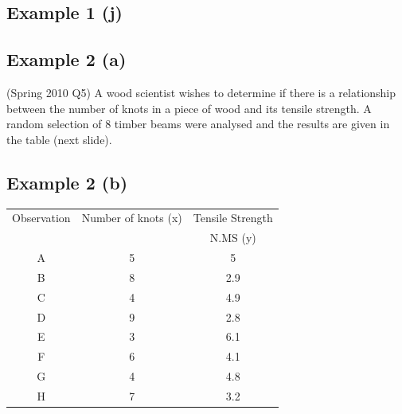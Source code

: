 \documentclass[]{report}
\begin{document}

\subsection{Example 1 (j)}

%


\subsection{Example 2 (a)}
(Spring 2010 Q5)\newline
A wood scientist wishes to determine if there is a relationship between the number of knots in a piece of wood and its tensile strength. A random selection of 8 timber beams were analysed and the results are given in the table (next slide).


\subsection{Example 2 (b)}
\begin{center}
	\begin{tabular}{|c|c|c|}
		\hline
		Observation &Number of knots (x) &Tensile Strength \\
		&&N.MS (y)\\ \hline
		A &5&5\\
		B &8&2.9\\
		C &4&4.9\\
		D &9&2.8\\
		E &3&6.1\\
		F &6&4.1\\
		G &4&4.8\\
		H &7&3.2\\
		\hline
	\end{tabular}
\end{center}


\end{document}
